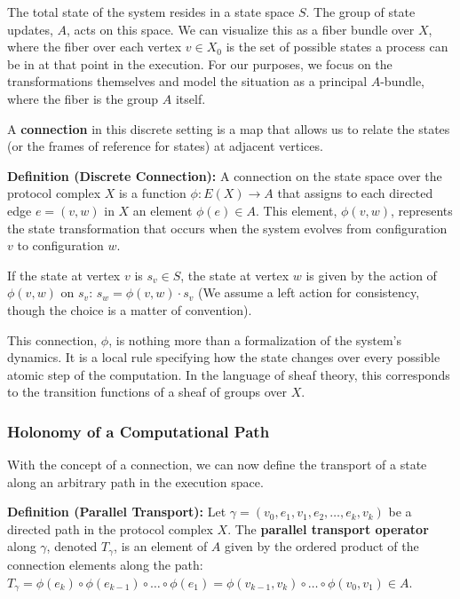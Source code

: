 \documentclass[
]{article}
\begin{document}
The total state of the system resides in a state space \(S\). The group
of state updates, \(A\), acts on this space. We can visualize this as a
fiber bundle over \(X\), where the fiber over each vertex \(v \in X_0\)
is the set of possible states a process can be in at that point in the
execution. For our purposes, we focus on the transformations themselves
and model the situation as a principal \(A\)-bundle, where the fiber is
the group \(A\) itself.

A \textbf{connection} in this discrete setting is a map that allows us
to relate the states (or the frames of reference for states) at adjacent
vertices.

\textbf{Definition (Discrete Connection):} A connection on the state
space over the protocol complex \(X\) is a function \(\phi: E(X) \to A\)
that assigns to each directed edge \(e = (v, w)\) in \(X\) an element
\(\phi(e) \in A\). This element, \(\phi(v, w)\), represents the state
transformation that occurs when the system evolves from configuration
\(v\) to configuration \(w\).

If the state at vertex \(v\) is \(s_v \in S\), the state at vertex \(w\)
is given by the action of \(\phi(v,w)\) on \(s_v\):
\(s_w = \phi(v, w) \cdot s_v\) (We assume a left action for consistency,
though the choice is a matter of convention).

This connection, \(\phi\), is nothing more than a formalization of the
system's dynamics. It is a local rule specifying how the state changes
over every possible atomic step of the computation. In the language of
sheaf theory, this corresponds to the transition functions of a sheaf of
groups over \(X\).

\subsubsection{Holonomy of a Computational
Path}\label{holonomy-of-a-computational-path}

With the concept of a connection, we can now define the transport of a
state along an arbitrary path in the execution space.

\textbf{Definition (Parallel Transport):} Let
\(\gamma = (v_0, e_1, v_1, e_2, \dots, e_k, v_k)\) be a directed path in
the protocol complex \(X\). The \textbf{parallel transport operator}
along \(\gamma\), denoted \(T_\gamma\), is an element of \(A\) given by
the ordered product of the connection elements along the path:
\(T_\gamma = \phi(e_k) \circ \phi(e_{k-1}) \circ \dots \circ \phi(e_1) = \phi(v_{k-1}, v_k) \circ \dots \circ \phi(v_0, v_1) \in A\).
\end{document}

